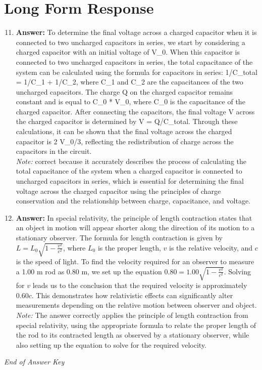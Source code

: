 \documentclass[12pt]{article}
\begin{document}
\section*{Long Form Response}
\begin{enumerate}[label=\arabic*.]
\setcounter{enumi}{10}
\item \textbf{Answer:} To determine the final voltage across a charged capacitor when it is connected to two uncharged capacitors in series, we start by considering a charged capacitor with an initial voltage of V\_0. When this capacitor is connected to two uncharged capacitors in series, the total capacitance of the system can be calculated using the formula for capacitors in series: 1/C\_total = 1/C\_1 + 1/C\_2, where C\_1 and C\_2 are the capacitances of the two uncharged capacitors. The charge Q on the charged capacitor remains constant and is equal to C\_0 * V\_0, where C\_0 is the capacitance of the charged capacitor. After connecting the capacitors, the final voltage V across the charged capacitor is determined by V = Q/C\_total. Through these calculations, it can be shown that the final voltage across the charged capacitor is 2 V\_0/3, reflecting the redistribution of charge across the capacitors in the circuit.
\\ \textit{Note:} correct because it accurately describes the process of calculating the total capacitance of the system when a charged capacitor is connected to uncharged capacitors in series, which is essential for determining the final voltage across the charged capacitor using the principles of charge conservation and the relationship between charge, capacitance, and voltage.
\item \textbf{Answer:} In special relativity, the principle of length contraction states that an object in motion will appear shorter along the direction of its motion to a stationary observer. The formula for length contraction is given by \( L = L_0 \sqrt{1 - \frac{v^2}{c^2}} \), where \( L_0 \) is the proper length, \( v \) is the relative velocity, and \( c \) is the speed of light. To find the velocity required for an observer to measure a 1.00 m rod as 0.80 m, we set up the equation \( 0.80 = 1.00 \sqrt{1 - \frac{v^2}{c^2}} \). Solving for \( v \) leads us to the conclusion that the required velocity is approximately \( 0.60 c \). This demonstrates how relativistic effects can significantly alter measurements depending on the relative motion between observer and object.
\\ \textit{Note:} The answer correctly applies the principle of length contraction from special relativity, using the appropriate formula to relate the proper length of the rod to its contracted length as observed by a stationary observer, while also setting up the equation to solve for the required velocity.
\end{enumerate}

\vfill
\noindent\textit{End of Answer Key}
\end{document}
